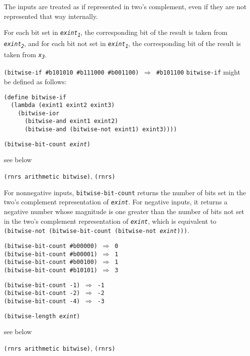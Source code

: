 The inputs are treated as if represented in two's complement, even
if they are not represented that way internally.


For each bit set in \texttt{\textit{exint\textsubscript{1}}}, the corresponding bit of the result
is taken from \texttt{\textit{exint\textsubscript{2}}}, and for each bit not set in \texttt{\textit{exint\textsubscript{1}}},
the corresponding bit of the result is taken from \texttt{\textit{x\textsubscript{3}}}.


\texttt{(bitwise-if \#{}b101010 \#{}b111000 \#{}b001100) \(\Rightarrow\) \#{}b101100}
\texttt{bitwise-if} might be defined as follows:

\begin{alltt}
(define bitwise-if
  (lambda (exint1 exint2 exint3)
    (bitwise-ior
      (bitwise-and exint1 exint2)
      (bitwise-and (bitwise-not exint1) exint3))))
\end{alltt}

\begin{description}

\label{objects_s136}\item[procedure] \texttt{(bitwise-bit-count \textit{exint})}



\item[returns] see below


\item[libraries] \texttt{(rnrs arithmetic bitwise)}, \texttt{(rnrs)}
\end{description}


For nonnegative inputs, \texttt{bitwise-bit-count} returns the number of bits
set in the two's complement representation of \texttt{\textit{exint}}.
For negative inputs, it returns a negative number whose magnitude is one
greater than the number of bits not set in the two's complement
representation of \texttt{\textit{exint}}, which is equivalent to
\texttt{(bitwise-not (bitwise-bit-count (bitwise-not \textit{exint})))}.


\begin{alltt}
(bitwise-bit-count \#{}b00000) \(\Rightarrow\) 0
(bitwise-bit-count \#{}b00001) \(\Rightarrow\) 1
(bitwise-bit-count \#{}b00100) \(\Rightarrow\) 1
(bitwise-bit-count \#{}b10101) \(\Rightarrow\) 3

(bitwise-bit-count -1) \(\Rightarrow\) -1
(bitwise-bit-count -2) \(\Rightarrow\) -2
(bitwise-bit-count -4) \(\Rightarrow\) -3
\end{alltt}

\begin{description}

\label{objects_s137}\item[procedure] \texttt{(bitwise-length \textit{exint})}



\item[returns] see below


\item[libraries] \texttt{(rnrs arithmetic bitwise)}, \texttt{(rnrs)}
\end{description}


